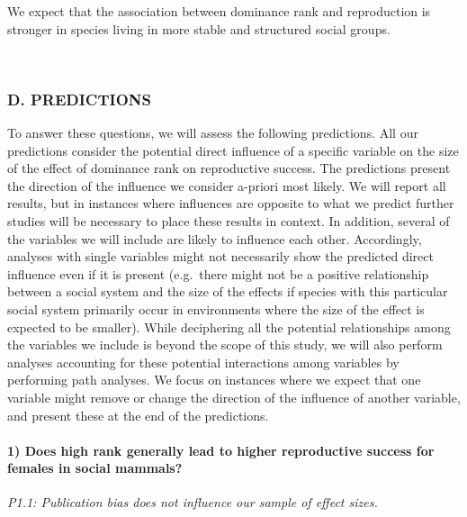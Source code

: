 \documentclass[]{article}
\let\oldparagraph\paragraph
\renewcommand{\paragraph}[1]{\oldparagraph{#1}\mbox{}}
\begin{document}
We expect that the association between dominance rank and reproduction
is stronger in species living in more stable and structured social
groups.

~

\hypertarget{d.-predictions}{%
\subsubsection{D. PREDICTIONS}\label{d.-predictions}}

To answer these questions, we will assess the following predictions. All
our predictions consider the potential direct influence of a specific
variable on the size of the effect of dominance rank on reproductive
success. The predictions present the direction of the influence we
consider a-priori most likely. We will report all results, but in
instances where influences are opposite to what we predict further
studies will be necessary to place these results in context. In
addition, several of the variables we will include are likely to
influence each other. Accordingly, analyses with single variables might
not necessarily show the predicted direct influence even if it is
present (e.g.~there might not be a positive relationship between a
social system and the size of the effects if species with this
particular social system primarily occur in environments where the size
of the effect is expected to be smaller). While deciphering all the
potential relationships among the variables we include is beyond the
scope of this study, we will also perform analyses accounting for these
potential interactions among variables by performing path analyses. We
focus on instances where we expect that one variable might remove or
change the direction of the influence of another variable, and present
these at the end of the predictions. ~

\hypertarget{does-high-rank-generally-lead-to-higher-reproductive-success-for-females-in-social-mammals-1}{%
\paragraph{\texorpdfstring{\textbf{1) Does high rank generally lead to
higher reproductive success for females in social
mammals?}}{1) Does high rank generally lead to higher reproductive success for females in social mammals?}}\label{does-high-rank-generally-lead-to-higher-reproductive-success-for-females-in-social-mammals-1}}

\emph{P1.1: Publication bias does not influence our sample of effect
sizes.}
\end{document}
